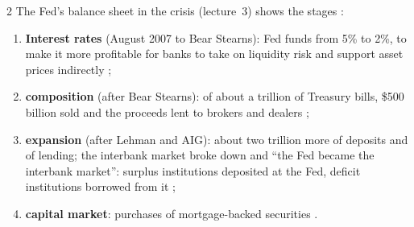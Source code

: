 \begin{paracol}{2}
The Fed's balance sheet in the crisis (lecture~3) shows the stages :
\begin{enumerate}
  \item \textbf{Interest rates} (August 2007 to Bear Stearns): Fed funds from 5\% to 2\%, to make it more profitable for banks to take on liquidity risk and support asset prices
        indirectly ;
  \item \textbf{composition} (after Bear Stearns): of about a trillion of Treasury bills, \$500 billion sold and the proceeds lent to brokers and dealers ;
  \item \textbf{expansion} (after Lehman and AIG): about two trillion more of deposits and of lending; the interbank market broke down and ``the Fed became the interbank market'':
        surplus institutions deposited at the Fed, deficit institutions borrowed from it ;
  \item \textbf{capital market}: purchases of mortgage-backed securities .
\end{enumerate}


\end{paracol}
